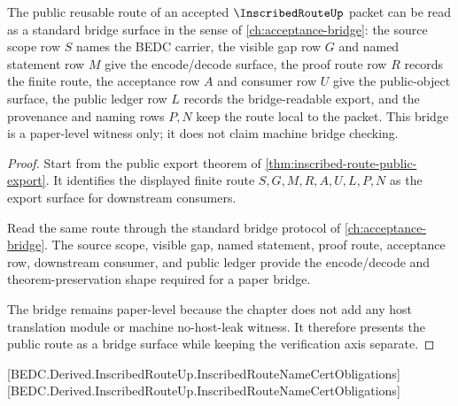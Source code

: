 \begin{theorem}
\label{thm:inscribed-route-standard-bridge-surface}
The public reusable route of an accepted $\InscribedRouteUp$ packet can be read as a standard bridge surface in the sense of \autoref{ch:acceptance-bridge}: the source scope row $S$ names the BEDC carrier, the visible gap row $G$ and named statement row $M$ give the encode/decode surface, the proof route row $R$ records the finite route, the acceptance row $A$ and consumer row $U$ give the public-object surface, the public ledger row $L$ records the bridge-readable export, and the provenance and naming rows $P,N$ keep the route local to the packet. This bridge is a paper-level witness only; it does not claim machine bridge checking.
\end{theorem}
\begin{proof}
Start from the public export theorem of \autoref{thm:inscribed-route-public-export}. It identifies the displayed finite route $S,G,M,R,A,U,L,P,N$ as the export surface for downstream consumers.

Read the same route through the standard bridge protocol of \autoref{ch:acceptance-bridge}. The source scope, visible gap, named statement, proof route, acceptance row, downstream consumer, and public ledger provide the encode/decode and theorem-preservation shape required for a paper bridge.

The bridge remains paper-level because the chapter does not add any host translation module or machine no-host-leak witness. It therefore presents the public route as a bridge surface while keeping the verification axis separate.
\end{proof}

[BEDC.Derived.InscribedRouteUp.InscribedRouteNameCertObligations]
[BEDC.Derived.InscribedRouteUp.InscribedRouteNameCertObligations]

